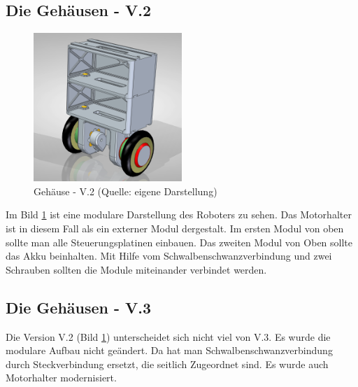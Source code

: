 \subsection{Die Gehäusen - V.2}
\begin{figure}[!h]  %
	\centering\includegraphics[width=0.5\textwidth]{images/gehaeuse-v2.png}
	\caption{Gehäuse - V.2 \newline (Quelle: eigene Darstellung)}
	\label{gehaeuse-v2} %
\end{figure}
Im Bild \ref{gehaeuse-v2} ist eine modulare Darstellung des Roboters zu sehen. Das Motorhalter ist in diesem Fall als ein externer Modul dergestalt. Im ersten Modul von oben sollte man alle Steuerungsplatinen  einbauen. Das zweiten Modul von Oben sollte  das Akku beinhalten. Mit Hilfe vom Schwalbenschwanzverbindung und zwei Schrauben sollten die Module miteinander verbindet werden.

\subsection{Die Gehäusen - V.3}

Die Version V.2 (Bild \ref{gehaeuse-v2}) unterscheidet sich nicht viel von V.3. Es wurde die modulare Aufbau nicht geändert. Da hat man Schwalbenschwanzverbindung durch Steckverbindung ersetzt, die seitlich Zugeordnet sind. Es wurde auch Motorhalter modernisiert.

